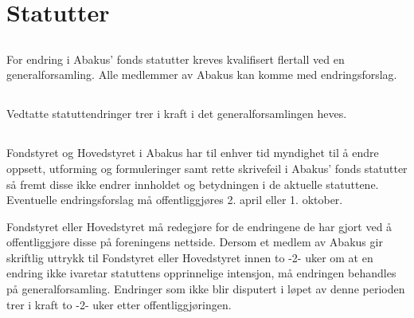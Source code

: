 \section{Statutter}

\subsection{}
For endring i Abakus’ fonds statutter kreves kvalifisert flertall ved en
generalforsamling. Alle medlemmer av Abakus kan komme med endringsforslag.

\subsection{}
Vedtatte statuttendringer trer i kraft i det generalforsamlingen heves.

\subsection{}
Fondstyret og Hovedstyret i Abakus har til enhver tid myndighet til å endre oppsett, utforming og formuleringer samt rette skrivefeil i Abakus' fonds statutter så fremt disse ikke endrer innholdet og betydningen i de aktuelle statuttene. Eventuelle endringsforslag må offentliggjøres 2. april eller 1. oktober.

Fondstyret eller Hovedstyret må redegjøre for de endringene de har gjort ved å offentliggjøre disse på foreningens nettside. Dersom et medlem av Abakus gir skriftlig uttrykk til Fondstyret eller Hovedstyret innen to -2- uker om at en endring ikke ivaretar statuttens opprinnelige intensjon, må endringen behandles på generalforsamling. Endringer som ikke blir disputert i løpet av denne perioden trer i kraft to -2- uker etter offentliggjøringen.

